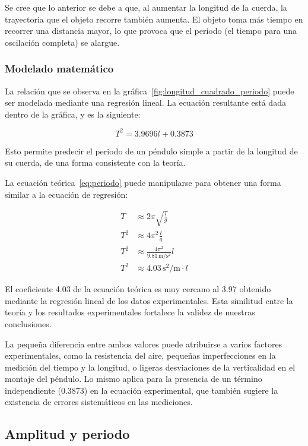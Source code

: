 \documentclass[twocolumn]{report}
\numberwithin{table}{section}
\begin{document}
Se cree que lo anterior se debe a que, al aumentar la longitud de la cuerda, la
trayectoria que el objeto recorre también aumenta. El objeto toma más
tiempo en recorrer una distancia mayor, lo que provoca que el periodo
(el tiempo para una oscilación completa) se alargue.

\subsubsection{Modelado matemático}

La relación que se observa en la gráfica~\ref{fig:longitud_cuadrado_periodo}
puede ser modelada mediante una regresión lineal. La ecuación resultante está
dada dentro de la gráfica, y es la siguiente:

\begin{equation}
  T^{2} = 3.9696l + 0.3873
\end{equation}

Esto permite predecir el periodo de un péndulo simple a partir de la longitud de
su cuerda, de una forma consistente con la teoría.

La ecuación teórica~\eqref{eq:periodo} puede manipularse para obtener una forma
similar a la ecuación de regresión:

\begin{align*}
  T &\approx 2\pi\sqrt{\frac{l}{g}} \\
  T^{2} &\approx 4\pi^{2}\frac{l}{g} \\
  T^{2} &\approx \frac{4\pi^{2}}{9.81\,\text{m/s$^{2}$}}l \\
  T^{2} &\approx 4.03\,\text{s$^{2}$/m} \cdot l
\end{align*}

El coeficiente 4.03 de la ecuación teórica es muy cercano al 3.97 obtenido
mediante la regresión lineal de los datos experimentales. Esta similitud
entre la teoría y los resultados experimentales fortalece la validez de
nuestras conclusiones.

La pequeña diferencia entre ambos valores puede atribuirse a varios factores
experimentales, como la resistencia del aire, pequeñas imperfecciones en la
medición del tiempo y la longitud, o ligeras desviaciones de la verticalidad en
el montaje del péndulo. Lo mismo aplica para la presencia de un término
independiente (0.3873) en la ecuación experimental, que también sugiere la
existencia de errores sistemáticos en las mediciones.

\subsection{Amplitud y periodo}
\end{document}
